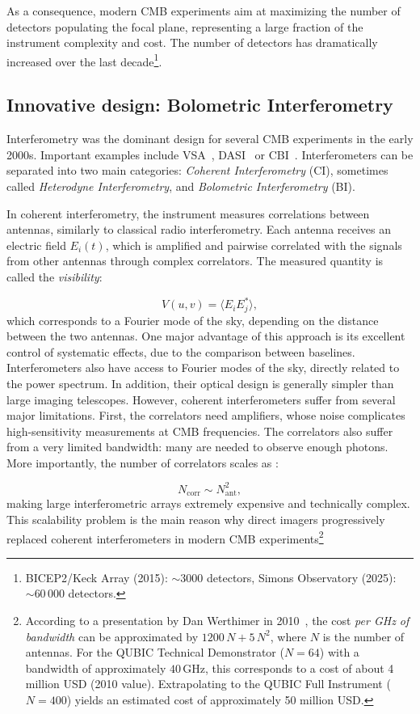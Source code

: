 \documentclass[../../thesis.tex]{subfiles}
\begin{document}
As a consequence, modern CMB experiments aim at maximizing the number of detectors populating the focal plane, representing a large fraction of the instrument complexity and cost. The number of detectors has dramatically increased over the last decade\footnote{BICEP2/Keck Array (2015): $\sim 3000$ detectors, Simons Observatory (2025): $\sim 60\,000$ detectors.}.

\subsection{Innovative design: Bolometric Interferometry}

Interferometry was the dominant design for several CMB experiments in the early 2000s. Important examples include VSA~\cite{VSA}, DASI~\cite{DASI} or CBI~\cite{CBI}. Interferometers can be separated into two main categories: \emph{Coherent Interferometry} (CI), sometimes called \emph{Heterodyne Interferometry}, and \emph{Bolometric Interferometry} (BI).

In coherent interferometry, the instrument measures correlations between antennas, similarly to classical radio interferometry. Each antenna receives an electric field $E_i(t)$, which is amplified and pairwise correlated with the signals from other antennas through complex correlators. The measured quantity is called the \emph{visibility}:

\begin{equation}
    V(u,v) = \langle E_i E_j^\ast \rangle,
\end{equation}
which corresponds to a Fourier mode of the sky, depending on the distance between the two antennas. One major advantage of this approach is its excellent control of systematic effects, due to the comparison between baselines. Interferometers also have access to Fourier modes of the sky, directly related to the power spectrum. In addition, their optical design is generally simpler than large imaging telescopes. However, coherent interferometers suffer from several major limitations. First, the correlators need amplifiers, whose noise complicates high-sensitivity measurements at CMB frequencies. The correlators also suffer from a very limited bandwidth: many are needed to observe enough photons. More importantly, the number of correlators scales as :

\begin{equation}
    N_{\mathrm{corr}} \sim N_{\mathrm{ant}}^2,
\end{equation}
making large interferometric arrays extremely expensive and technically complex. This scalability problem is the main reason why direct imagers progressively replaced coherent interferometers in modern CMB experiments\footnote{According to a presentation by Dan Werthimer in 2010~\cite{werthimer2010}, the cost \emph{per GHz of bandwidth} can be approximated by $1200\,N + 5\,N^2$, where $N$ is the number of antennas. For the QUBIC Technical Demonstrator ($N=64$) with a bandwidth of approximately $40\,\mathrm{GHz}$, this corresponds to a cost of about 4 million USD (2010 value). Extrapolating to the QUBIC Full Instrument ($N=400$) yields an estimated cost of approximately 50 million USD.}
\end{document}
